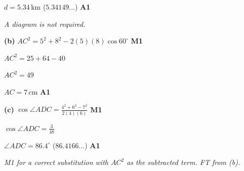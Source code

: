 \documentclass[12pt, twoside]{article}
\begin{document}
\begin{enumerate}[itemsep=0.3cm]
$d = 5.34\,\text{km}$ \quad ($5.34149\ldots$) \hfill \textbf{A1}

\emph{A diagram is not required.}

\textbf{(b)} $AC^{2} = 5^{2} + 8^{2} - 2(5)(8)\cos 60^\circ$ \hfill \textbf{M1}

$AC^{2} = 25 + 64 - 40$

$AC^{2} = 49$

$AC = 7\,\text{cm}$ \hfill \textbf{A1}

\textbf{(c)} $\cos \angle ADC = \frac{4^{2} + 6^{2} - 7^{2}}{2(4)(6)}$ \hfill \textbf{M1}

$\cos \angle ADC = \frac{3}{48}$

$\angle ADC = 86.4^\circ$ \quad ($86.4166\ldots$) \hfill \textbf{A1}

\emph{M1 for a correct substitution with $AC^{2}$ as the subtracted term.
FT from (b).}

\end{enumerate}
\end{document}
